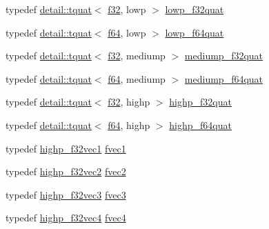 \begin{DoxyCompactItemize}
typedef \hyperlink{structglm_1_1detail_1_1tquat}{detail\+::tquat}$<$ \hyperlink{group__gtc__type__precision_ga0ec999b57f5330d9021256e96038df04}{f32}, lowp $>$ \hyperlink{group__gtc__type__precision_ga83edc5f21bfa41f72f881b29aabbd919}{lowp\+\_\+f32quat}
\item 
typedef \hyperlink{structglm_1_1detail_1_1tquat}{detail\+::tquat}$<$ \hyperlink{group__gtc__type__precision_ga2bba392e555124b36cde6abba349bab3}{f64}, lowp $>$ \hyperlink{group__gtc__type__precision_ga225e6f95dd6a7049b1a86db23b90cbac}{lowp\+\_\+f64quat}
\item 
typedef \hyperlink{structglm_1_1detail_1_1tquat}{detail\+::tquat}$<$ \hyperlink{group__gtc__type__precision_ga0ec999b57f5330d9021256e96038df04}{f32}, mediump $>$ \hyperlink{group__gtc__type__precision_gab038e3482ca401bca2b2634c96f44f09}{mediump\+\_\+f32quat}
\item 
typedef \hyperlink{structglm_1_1detail_1_1tquat}{detail\+::tquat}$<$ \hyperlink{group__gtc__type__precision_ga2bba392e555124b36cde6abba349bab3}{f64}, mediump $>$ \hyperlink{group__gtc__type__precision_ga7cf626acf7f4fc29355c147bfe05163d}{mediump\+\_\+f64quat}
\item 
typedef \hyperlink{structglm_1_1detail_1_1tquat}{detail\+::tquat}$<$ \hyperlink{group__gtc__type__precision_ga0ec999b57f5330d9021256e96038df04}{f32}, highp $>$ \hyperlink{group__gtc__type__precision_ga26eef27d2efbd759e7e93c40672402e9}{highp\+\_\+f32quat}
\item 
typedef \hyperlink{structglm_1_1detail_1_1tquat}{detail\+::tquat}$<$ \hyperlink{group__gtc__type__precision_ga2bba392e555124b36cde6abba349bab3}{f64}, highp $>$ \hyperlink{group__gtc__type__precision_ga9372e8b60f401fd94aba637b3ed17cfc}{highp\+\_\+f64quat}
\item 
typedef \hyperlink{group__gtc__type__precision_gac8be8ce31b9df0a5005d7c7458a3d03e}{highp\+\_\+f32vec1} \hyperlink{group__gtc__type__precision_gab927d62f22fa57461367011950cec650}{fvec1}
\item 
typedef \hyperlink{group__gtc__type__precision_gabba3e1b3ae0bcaa7aaac573c08c2f8d3}{highp\+\_\+f32vec2} \hyperlink{group__gtc__type__precision_gaafd518792a4646c7bb60aabc62a4684c}{fvec2}
\item 
typedef \hyperlink{group__gtc__type__precision_ga581a4a4eb1f3a269d16af0c4e2d8daf4}{highp\+\_\+f32vec3} \hyperlink{group__gtc__type__precision_ga33b85a14a8f68ec99029ff13db6af369}{fvec3}
\item 
typedef \hyperlink{group__gtc__type__precision_ga53d3c1a17e2e6f26ee5ad1e8879d710e}{highp\+\_\+f32vec4} \hyperlink{group__gtc__type__precision_ga55d1365630d3b3ecf7c7f4e7c29a9cb1}{fvec4}

\end{DoxyCompactItemize}
